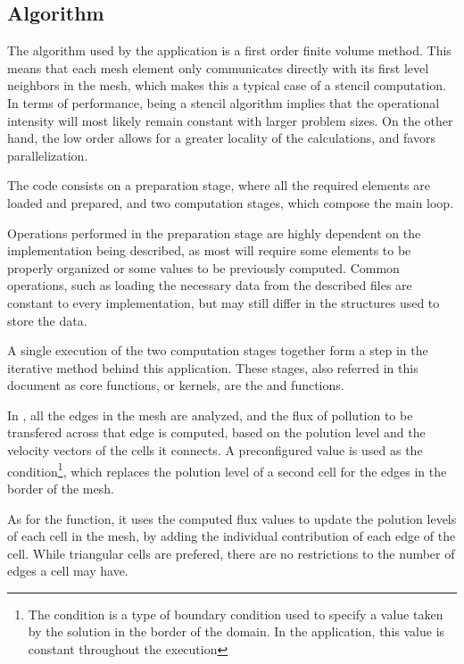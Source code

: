\subsection{Algorithm}

The algorithm used by the \polu application is a first order finite volume method. This means that each mesh element only communicates directly with its first level neighbors in the mesh, which makes this a typical case of a stencil computation. In terms of performance, being a stencil algorithm implies that the operational intensity  will most likely remain constant with larger problem sizes. On the other hand, the low order allows for a greater locality of the calculations, and favors parallelization.

The code consists on a preparation stage, where all the required elements are loaded and prepared, and two computation stages, which compose the main loop.

Operations performed in the preparation stage are highly dependent on the implementation being described, as most will require some elements to be properly organized or some values to be previously computed. Common operations, such as loading the necessary data from the described files are constant to every implementation, but may still differ in the structures used to store the data.

A single execution of the two computation stages together form a step in the iterative method behind this application. These stages, also referred in this document as core functions, or kernels, are the \computeflux and \update functions.

In \computeflux, all the edges in the mesh are analyzed, and the flux of pollution to be transfered across that edge is computed, based on the polution level and the velocity vectors of the cells it connects. A preconfigured value is used as the \dirichlet condition\footnote{The \dirichlet condition is a type of boundary condition used to specify a value taken by the solution in the border of the domain. In the \polu application, this value is constant throughout the execution}, which replaces the polution level of a second cell for the edges in the border of the mesh.

As for the \update function, it uses the computed flux values to update the polution levels of each cell in the mesh, by adding the individual contribution of each edge of the cell. While triangular cells are prefered, there are no restrictions to the number of edges a cell may have.
